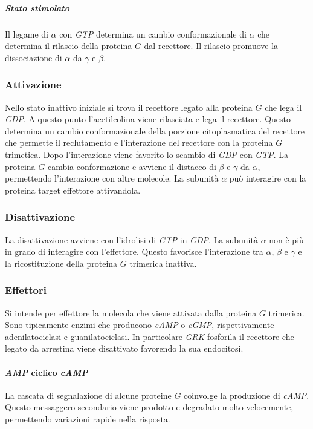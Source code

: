 				\subparagraph{Stato stimolato}
				Il legame di $\alpha$ con \emph{GTP} determina un cambio conformazionale di $\alpha$ che determina il rilascio della proteina $G$ dal recettore.
				Il rilascio promuove la dissociazione di $\alpha$ da $\gamma$ e $\beta$.

		\subsubsection{Attivazione}
		Nello stato inattivo iniziale si trova il recettore legato alla proteina $G$ che lega il \emph{GDP}.
		A questo punto l'acetilcolina viene rilasciata e lega il recettore.
		Questo determina un cambio conformazionale della porzione citoplasmatica del recettore che permette il reclutamento e l'interazione del recettore con la proteina $G$ trimetica.
		Dopo l'interazione viene favorito lo scambio di \emph{GDP} con \emph{GTP}.
		La proteina $G$ cambia conformazione e avviene il distacco di $\beta$ e $\gamma$ da $\alpha$, permettendo l'interazione con altre molecole.
		La subunit\`a $\alpha$ pu\`o interagire con la proteina target effettore attivandola.

		\subsubsection{Disattivazione}
		La disattivazione avviene con l'idrolisi di \emph{GTP} in \emph{GDP}.
		La subunit\`a $\alpha$ non \`e pi\`u in grado di interagire con l'effettore.
		Questo favorisce l'interazione tra $\alpha$, $\beta$ e $\gamma$ e la ricostituzione della proteina $G$ trimerica inattiva.

		\subsubsection{Effettori}
		Si intende per effettore la molecola che viene attivata dalla proteina $G$ trimerica.
		Sono tipicamente enzimi che producono \emph{cAMP} o \emph{cGMP}, rispettivamente adenilatociclasi e guanilatociclasi.
		In particolare \emph{GRK} fosforila il recettore che legato da arrestina viene disattivato favorendo la sua endocitosi.

			\paragraph{\emph{AMP} ciclico \emph{cAMP}}
			La cascata di segnalazione di alcune proteine $G$ coinvolge la produzione di \emph{cAMP}.
			Questo messaggero secondario viene prodotto e degradato molto velocemente, permettendo variazioni rapide nella risposta.

